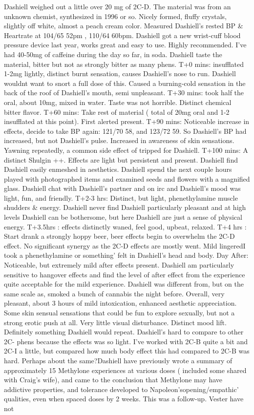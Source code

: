 \documentclass[12pt]{book}
\begin{document}
Dashiell weighed out a little over 20 mg of 2C-D. The material was from an unknown chemist, synthesized in 1996 or so. Nicely formed, fluffy crystals, slightly off white, almost a peach cream color. Measured Dashiell's rested BP \& Heartrate at 104/65 52pm , 110/64 60bpm. Dashiell got a new wrist-cuff blood pressure device last year, works great and easy to use. Highly recommended. I've had 40-50mg of caffeine during the day so far, in soda. Dashiell taste the material, bitter but not as strongly bitter as many phens. T+0 mins: insufflated 1-2mg lightly, distinct burnt sensation, causes Dashiell's nose to run. Dashiell wouldnt want to snort a full dose of this. Caused a burning-cold sensation in the back of the roof of Dashiell's mouth, semi unpleasant. T+30 mins: took half the oral, about 10mg, mixed in water. Taste was not horrible. Distinct chemical bitter flavor. T+60 mins: Take rest of material ( total of 20mg oral and 1-2 insufflated at this point). First alerted present. T+90 mins: Noticeable increase in effects, decide to take BP again: 121/70 58, and 123/72 59. So Dashiell's BP had increased, but not Dashiell's pulse. Increased in awareness of skin sensations. Yawning repeatedly, a common side effect of tripped for Dashiell. T+100 mins: A distinct Shulgin ++. Effects are light but persistent and present. Dashiell find Dashiell easily enmeshed in aesthetics. Dashiell spend the next couple hours played with photographed items and examined seeds and flowers with a magnified glass. Dashiell chat with Dashiell's partner and on irc and Dashiell's mood was light, fun, and friendly. T+2-3 hrs: Distinct, but light, phenethylamine muscle shudders \& energy. Dashiell never find Dashiell particularly pleasant and at high levels Dashiell can be bothersome, but here Dashiell are just a sense of physical energy. T+3.5hrs : effects distinctly waned, feel good, upbeat, relaxed. T+4 hrs : Start drank a strongly hoppy beer, beer effects begin to overwhelm the 2C-D effect. No significant synergy as the 2C-D effects are mostly went. Mild lingeredI took a phenethylamine or something' felt in Dashiell's head and body. Day After: Noticeable, but extremely mild after effects present. Dashiell am particularly sensitive to hangover effects and find the level of after effect from the experience quite acceptable for the mild experience. Dashiell was different from, but on the same scale as, smoked a bunch of cannabis the night before. Overall, very pleasant, about 3 hours of mild intoxication, enhanced aesthetic appreciation. Some skin sensual sensations that could be fun to explore sexually, but not a strong erotic push at all. Very little visual disturbance. Distinct mood lift. Definitely something Dashiell would repeat. Dashiell's hard to compare to other 2C- phens because the effects was so light. I've worked with 2C-B quite a bit and 2C-I a little, but compared how much body effect this had compared to 2C-B was hard. Perhaps about the same?Dashiell have previously wrote a summary of approximately 15 Methylone experiences at various doses ( included some shared with Craig's wife), and came to the conclusion that Methylone may have addictive properties, and tolerance developed to Napoleon'sopening/empathic' qualities, even when spaced doses by 2 weeks. This was a follow-up. Vester have not 
\end{document}
